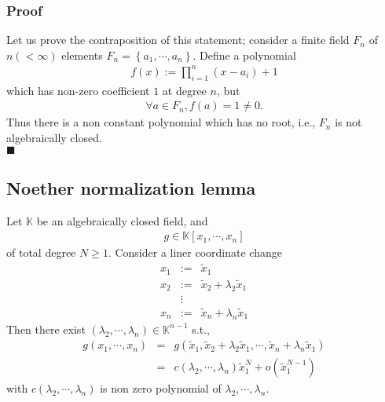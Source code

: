 \documentclass[11pt]{book}
\begin{document}
\subsubsection{Proof}
Let us prove the contraposition of this statement; consider a finite field $F_n$ of $n (< \infty) $ elements $F_n = \left\{a_1, \cdots, a_n \right\}$.
Define a polynomial
\begin{eqnarray}
f(x) := \prod_{i=1}^n (x-a_i) + 1
\end{eqnarray}
which has non-zero coefficient $1$ at degree $n$, but
\begin{eqnarray}
\forall a \in F_n, f(a) = 1 \neq 0.
\end{eqnarray}
Thus there is a non constant polynomial which has no root, i.e., $F_n$ is not algebraically closed.\\
$\blacksquare$



\subsection{Noether normalization lemma}
\label{NoetherNormalizationLemma}
Let $\mathbb{K}$ be an algebraically closed field, and
\begin{eqnarray}
g \in \mathbb{K}[x_1, \cdots, x_n]
\end{eqnarray}
of total degree $N \geq 1$.
Consider a liner coordinate change
\begin{eqnarray}
x_1 &:=& \tilde{x}_1 \\
x_2 &:=& \tilde{x}_2 + \lambda_2 \tilde{x}_1 \\
&\vdots& \\
x_n &:=& \tilde{x}_n + \lambda_n \tilde{x}_1 
\end{eqnarray}
Then there exist $(\lambda_2, \cdots, \lambda_n) \in \mathbb{K}^{n-1}$ s.t.,
\begin{eqnarray}
g(x_1, \cdots, x_n) &=& g(\tilde{x}_1,\tilde{x}_2 + \lambda_2 \tilde{x}_1, \cdots,  \tilde{x}_n + \lambda_n \tilde{x}_1 ) \\
&=& c(\lambda_2, \cdots, \lambda_n) \tilde{x}_1^{N} + o( \tilde{x}_1^{N-1} )
\end{eqnarray}
with $c(\lambda_2, \cdots, \lambda_n)$ is non zero polynomial of $\lambda_2, \cdots, \lambda_n$. 
\end{document}
